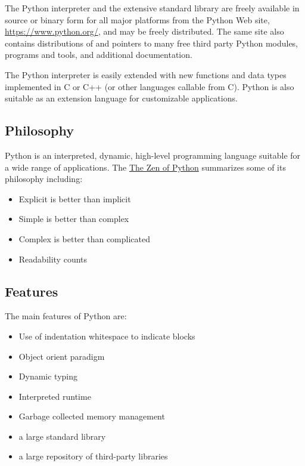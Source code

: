 The Python interpreter and the extensive standard library are freely
available in source or binary form for all major platforms from the
Python Web site, \url{https://www.python.org/}, and may be freely
distributed. The same site also contains distributions of and pointers
to many free third party Python modules, programs and tools, and
additional documentation.

The Python interpreter is easily extended with new functions and data
types implemented in C or C++ (or other languages callable from
C). Python is also suitable as an extension language for customizable
applications.


\subsection{Philosophy}
\label{\detokenize{lesson/prg/python_intro:philosophy}}
Python is an interpreted, dynamic, high-level programming language
suitable for a wide range of applications. The \href{https://www.python.org/dev/peps/pep-0020/}{The Zen of Python}
summarizes some of its philosophy including:
\begin{itemize}
\item {} 
Explicit is better than implicit

\item {} 
Simple is better than complex

\item {} 
Complex is better than complicated

\item {} 
Readability counts

\end{itemize}


\subsection{Features}
\label{\detokenize{lesson/prg/python_intro:features}}
The main features of Python are:
\begin{itemize}
\item {} 
Use of indentation whitespace to indicate blocks

\item {} 
Object orient paradigm

\item {} 
Dynamic typing

\item {} 
Interpreted runtime

\item {} 
Garbage collected memory management

\item {} 
a large standard library

\item {} 
a large repository of third-party libraries

\end{itemize}


